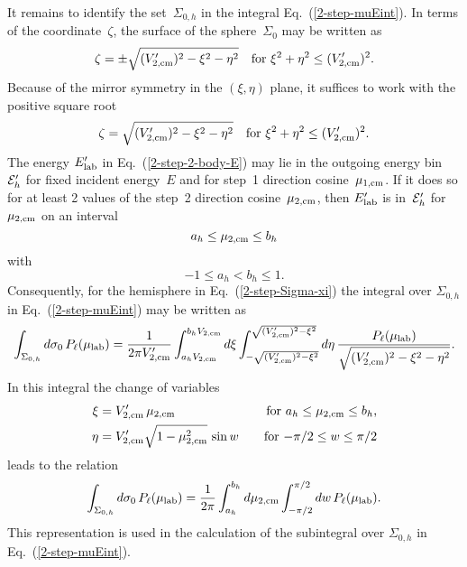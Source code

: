 {\begin{figure}

\end{figure}

It remains to identify the set~$\Sigma_{0, h}$ in the integral
Eq.~(\ref{2-step-muEint}).
In terms of the coordinate~$\zeta$, the surface of the sphere~$\Sigma_0$ may
be written as
\begin{equation}
  \zeta = \pm \sqrt{
     (V_{\text{2,cm}}')^2 - \xi^2 - \eta^2 }
     \quad \text{for $\xi^2 + \eta^2 \le (V_{\text{2,cm}}')^2.$}
  \label{2-step-Sigma-xi}
\end{equation} 
Because of the mirror symmetry in the $(\xi, \eta)$ plane, it suffices to work with the
positive square root
\begin{equation}
  \zeta = \sqrt{
     (V_{\text{2,cm}}')^2 - \xi^2 - \eta^2 }
     \quad \text{for $\xi^2 + \eta^2 \le (V_{\text{2,cm}}')^2.$}
  \label{2-step-def-zeta}
\end{equation}
The energy
$E_{\text{lab}}'$ in Eq.~(\ref{2-step-2-body-E}) may lie in the outgoing 
energy bin~${\cal E}_h'$ for fixed incident energy~$E$
and for step~1 direction cosine~$\mu_{\text{1,cm}}$.  If it does so
for at least 2 values of the step~2 direction cosine~$\mu_{\text{2,cm}}$,
then $E_{\text{lab}}'$ is in~${\cal E}_h'$ for $\mu_{\text{2,cm}}$
on an interval
\begin{equation}
  a_h \le \mu_{\text{2,cm}} \le b_h
  \label{2-step-ab-range}
\end{equation}
with
$$
  -1 \le a_h < b_h \le 1.
$$
Consequently, for the hemisphere in Eq.~(\ref{2-step-Sigma-xi}) the integral
over $\Sigma_{0,h}$ in Eq.~(\ref{2-step-muEint}) may be written as
\begin{equation}
   \int_{\Sigma_{0,h}} d\sigma_0 \, P_\ell( \mu_{\text{lab}} ) =
   \frac{1}{2 \pi V_{\text{2,cm}}' }
   \int_{ a_h V_{\text{2,cm}}}^{b_h V_{\text{2,cm}}} d\xi \int_{- \sqrt{ (V_{\text{2,cm}}')^2 - \xi^2 }}
                           ^{\sqrt{ (V_{\text{2,cm}}')^2 - \xi^2 }} d\eta \,
          \frac {P_\ell( \mu_{\text{lab}} ) } { \sqrt{ (V_{\text{2,cm}}')^2 - \xi^2 - \eta^2}}.
  \label{2-step-Sigma-int}
\end{equation}
In this integral the change of variables
\begin{alignat}{2}
  \xi &= V_{\text{2,cm}}' \, \mu_{\text{2,cm}} 
    \quad &\text{for $a_h \le \mu_{\text{2,cm}} \le b_h$,}
      \label{2-step-def-xi} \\
  \eta &= V_{\text{2,cm}}' \sqrt{ 1 - \mu_{\text{2,cm}}^2 } \, \sin w 
    \quad &\text{for $-\pi/2 \le w \le \pi/2$}
  \label{2-step-def-eta}
\end{alignat}
leads to the relation
\begin{equation}
   \int_{\Sigma_{0,h}} d\sigma_0 \, P_\ell( \mu_{\text{lab}} ) =
   \frac{1}{2 \pi }
   \int_{ a_h}^{b_h} d\mu_{\text{2,cm}} \int_{- \pi/2}
                           ^{\pi/2} dw \,
          P_\ell( \mu_{\text{lab}} ) .
 \label{2-step-int-sigma}
\end{equation}
This representation is used in the calculation of the
subintegral over $\Sigma_{0,h}$ in Eq.~(\ref{2-step-muEint}).

}
